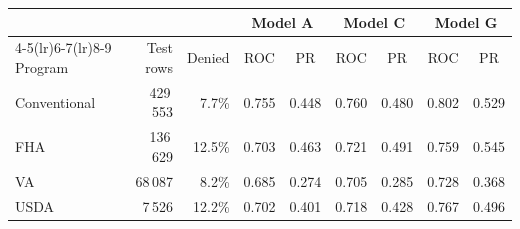 \begin{tabular}{@{}lrrcccccc@{}}
\toprule
 & & & \multicolumn{2}{c}{Model A} & \multicolumn{2}{c}{Model C} & \multicolumn{2}{c}{Model G} \\
\cmidrule(lr){4-5}\cmidrule(lr){6-7}\cmidrule(lr){8-9}
Program & Test rows & Denied & ROC & PR & ROC & PR & ROC & PR \\
\midrule
Conventional & 429\,553 & 7.7\% & 0.755 & 0.448 & 0.760 & 0.480 & 0.802 & 0.529 \\
FHA & 136\,629 & 12.5\% & 0.703 & 0.463 & 0.721 & 0.491 & 0.759 & 0.545 \\
VA & 68\,087 & 8.2\% & 0.685 & 0.274 & 0.705 & 0.285 & 0.728 & 0.368 \\
USDA & 7\,526 & 12.2\% & 0.702 & 0.401 & 0.718 & 0.428 & 0.767 & 0.496 \\
\bottomrule
\end{tabular}
